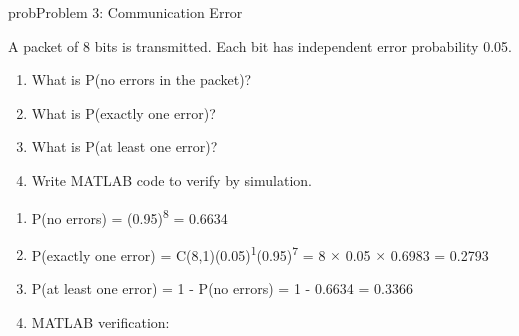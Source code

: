 \begin{PSbox}[unbreakable]{prob}{Problem 3: Communication Error}

A packet of 8 bits is transmitted. Each bit has independent error probability 0.05.

\begin{enumerate}
\def\labelenumi{(\alph{enumi})}
\tightlist
\item
  What is P(no errors in the packet)?
\item
  What is P(exactly one error)?
\item
  What is P(at least one error)?
\item
  Write MATLAB code to verify by simulation.
\end{enumerate}

\PSsolution{} 

\begin{enumerate}
\def\labelenumi{(\alph{enumi})}
\item
  P(no errors) = (0.95)\textsuperscript{8} = 0.6634
\item
  P(exactly one error) = C(8,1)(0.05)\textsuperscript{1}(0.95)\textsuperscript{7} = 8 \ensuremath{\times} 0.05 \ensuremath{\times} 0.6983 = 0.2793
\item
  P(at least one error) = 1 - P(no errors) = 1 - 0.6634 = 0.3366
\item
  MATLAB verification:
\end{enumerate}



\end{PSbox}
